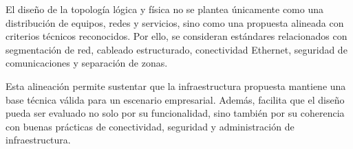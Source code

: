 \documentclass[11pt, a4paper, oneside]{report}
\begin{document}
El diseño de la topología lógica y física no se plantea únicamente como una distribución de equipos, redes y servicios, sino como una propuesta alineada con criterios técnicos reconocidos. Por ello, se consideran estándares relacionados con segmentación de red, cableado estructurado, conectividad Ethernet, seguridad de comunicaciones y separación de zonas.

Esta alineación permite sustentar que la infraestructura propuesta mantiene una base técnica válida para un escenario empresarial. Además, facilita que el diseño pueda ser evaluado no solo por su funcionalidad, sino también por su coherencia con buenas prácticas de conectividad, seguridad y administración de infraestructura.

\renewcommand{\arraystretch}{1.3}
\footnotesize
{}
\end{document}
